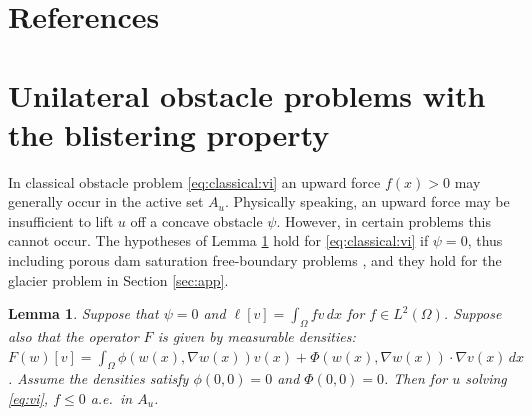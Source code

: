 \documentclass[]{interact}
\theoremstyle{plain}%
\newtheorem{lemma}[theorem]{Lemma}
\theoremstyle{definition}
\theoremstyle{remark}
\newcommand{\grad}{\nabla}
\begin{document}



\section{References}





\appendix
\section{Unilateral obstacle problems with the blistering property} \label{app:blistering}

In classical obstacle problem \eqref{eq:classical:vi} an upward force $f(x)>0$ may generally occur in the active set $A_u$.  Physically speaking, an upward force may be insufficient to lift $u$ off a concave obstacle $\psi$.  However, in certain problems this cannot occur.  The hypotheses of Lemma \ref{lem:blister} hold for \eqref{eq:classical:vi} if $\psi=0$, thus including porous dam saturation free-boundary problems \cite[for example]{AinsworthOdenLee1993}, and they hold for the glacier problem in Section \ref{sec:app}.

\begin{lemma} \label{lem:blister}
Suppose that $\psi=0$ and $\ell[v] = \int_\Omega fv\,dx$ for $f\in L^2(\Omega)$.  Suppose also that the operator $F$ is given by measurable densities: $F(w)[v]=\int_\Omega \phi(w(x),\grad w(x)) v(x) + \Phi(w(x),\grad w(x)) \cdot \grad v(x)\,dx$.  Assume the densities satisfy $\phi(0,0)=0$ and $\Phi(0,0)=0$.  Then for $u$ solving \eqref{eq:vi}, $f\le 0$ a.e.~in $A_u$.
\end{lemma}
\end{document}
